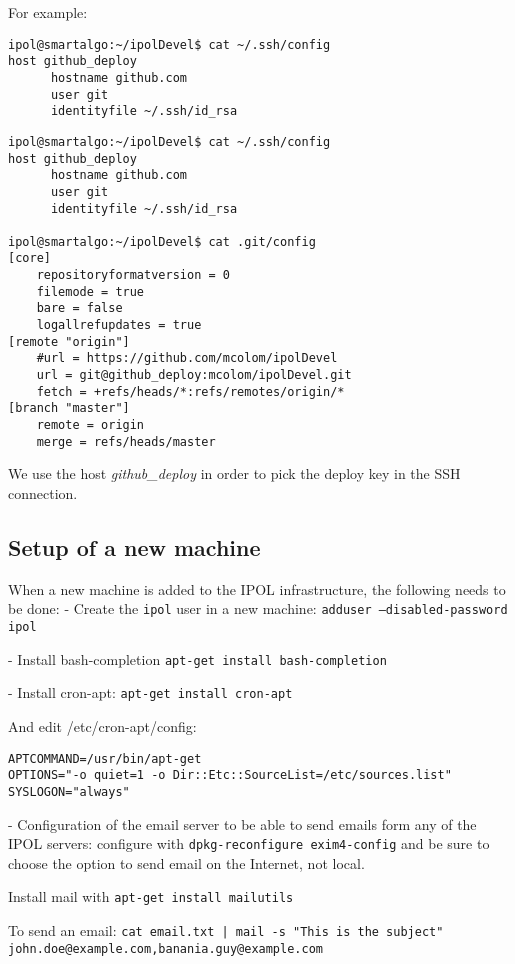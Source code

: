 For example:

\begin{verbatim}
ipol@smartalgo:~/ipolDevel$ cat ~/.ssh/config 
host github_deploy
      hostname github.com
      user git
      identityfile ~/.ssh/id_rsa
\end{verbatim}

\vspace{0.15cm}

\begin{verbatim}
ipol@smartalgo:~/ipolDevel$ cat ~/.ssh/config 
host github_deploy
      hostname github.com
      user git
      identityfile ~/.ssh/id_rsa

ipol@smartalgo:~/ipolDevel$ cat .git/config 
[core]
	repositoryformatversion = 0
	filemode = true
	bare = false
	logallrefupdates = true
[remote "origin"]
	#url = https://github.com/mcolom/ipolDevel
	url = git@github_deploy:mcolom/ipolDevel.git
	fetch = +refs/heads/*:refs/remotes/origin/*
[branch "master"]
	remote = origin
	merge = refs/heads/master
\end{verbatim}

We use the host \emph{github\_deploy} in order to pick the deploy key in the SSH connection.

\subsection{Setup of a new machine}
When a new machine is added to the IPOL infrastructure, the following needs to be done:
- Create the {\tt ipol} user in a new machine: {\tt adduser --disabled-password ipol}

- Install bash-completion {\tt apt-get install bash-completion}

- Install cron-apt: {\tt apt-get install cron-apt}

And edit /etc/cron-apt/config:
\begin{verbatim}
APTCOMMAND=/usr/bin/apt-get
OPTIONS="-o quiet=1 -o Dir::Etc::SourceList=/etc/sources.list"
SYSLOGON="always"
\end{verbatim}

- Configuration of the email server to be able to send emails form any of the IPOL servers: configure with {\tt dpkg-reconfigure exim4-config} and be sure to choose the option to send email on the Internet, not local.

Install mail with {\tt apt-get install mailutils}

To send an email: {\tt cat email.txt | mail -s "This is the subject" john.doe@example.com,banania.guy@example.com}


